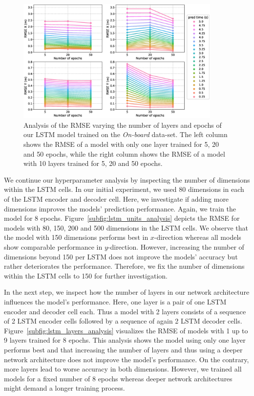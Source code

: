 \begin{figure}[t!]
  \centering
  \includegraphics[width=0.9\textwidth]{imgs/lstm_layers_epochs_analysis.eps}
  \caption{Analysis of the \ac{RMSE} varying the number of layers and epochs of our \ac{LSTM} model trained on the \emph{On-board} data-set. The left column shows the \ac{RMSE} of a model with only one layer trained for \num{5}, \num{20} and \num{50} epochs, while the right column shows the \ac{RMSE} of a model with \num{10} layers trained for \num{5}, \num{20} and \num{50} epochs.}
  \label{fig:lstm_layers_epochs_analysis}
\end{figure}

We continue our hyperparameter analysis by inspecting the number of dimensions within the \ac{LSTM} cells.
In our initial experiment, we used \num{80} dimensions in each of the \ac{LSTM} encoder and decoder cell.
Here, we investigate if adding more dimensions improves the models' prediction performance.
Again, we train the model for \num{8} epochs.
Figure~\ref{subfig:lstm_units_analysis} depicts the \ac{RMSE} for models with \num{80}, \num{150}, \num{200} and \num{500} dimensions in the \ac{LSTM} cells.
We observe that the model with \num{150} dimensions performs best in $x$-direction whereas all models show comparable performance in $y$-direction.
However, increasing the number of dimensions beyond \num{150} per \ac{LSTM} does not improve the models' accuracy but rather deteriorates the performance.
Therefore, we fix the number of dimensions within the \ac{LSTM} cells to \num{150} for further investigation.

In the next step, we inspect how the number of layers in our network architecture influences the model's performance.
Here, one layer is a pair of one \ac{LSTM} encoder and decoder cell each.
Thus a model with \num{2} layers consists of a sequence of \num{2} \ac{LSTM} encoder cells followed by a sequence of again \num{2} \ac{LSTM} decoder cells.
Figure~\ref{subfig:lstm_layers_analysis} visualizes the \ac{RMSE} of models with \num{1} up to \num{9} layers trained for \num{8} epochs.
This analysis shows the model using only one layer performs best and that increasing the number of layers and thus using a deeper network architecture does not improve the model's performance.
On the contrary, more layers lead to worse accuracy in both dimensions.
However, we trained all models for a fixed number of \num{8} epochs whereas deeper network architectures might demand a longer training process.


